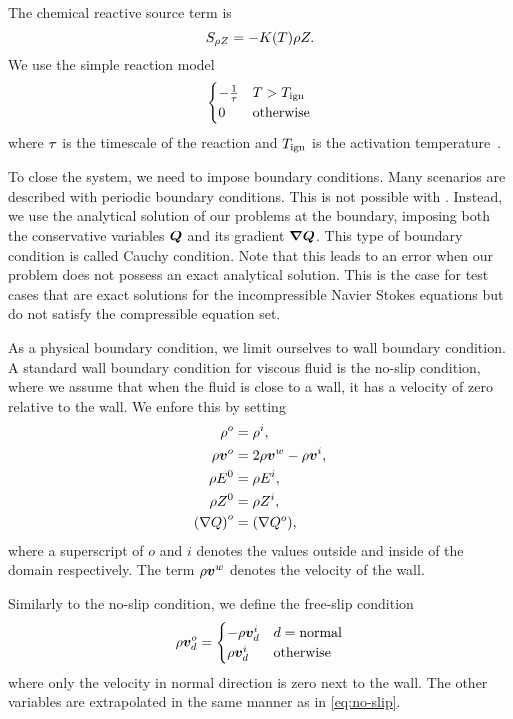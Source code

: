The chemical reactive source term is
\begin{equation}\label{eq:source-reaction}
  \source[\QZ] = - K(T) \QZ.
\end{equation}
We use the simple reaction model
\begin{equation}\label{eq:reaction-model}
\begin{cases}
  - \frac{1}{\tau} & T > T_{\text{ign}}\\
  0 & \text{otherwise}
\end{cases}  
\end{equation}
where $\tau$ is the timescale of the reaction and $T_{\text{ign}}$ is the activation temperature~\cite{hidalgo2011ader,helzel2000modified}.

To close the system, we need to impose boundary conditions.
Many scenarios are described with periodic boundary conditions.
This is not possible with \exahype{}.
Instead, we use the analytical solution of our problems at the boundary, imposing both the conservative variables $\bm{Q}$ and its gradient $\gradQ$.
This type of boundary condition is called Cauchy condition.
Note that this leads to an error when our problem does not possess an exact analytical solution.
This is the case for test cases that are exact solutions for the incompressible Navier Stokes equations but do not satisfy the compressible equation set.

As a physical boundary condition, we limit ourselves to wall boundary condition.
A standard wall boundary condition for viscous fluid is the no-slip condition, where we assume that when the fluid is close to a wall, it has a velocity of zero relative to the wall.
We enfore this by setting
\begin{align}
  \label{eq:no-slip}
  \begin{split}
  \rho^o &= \rho^i, \\
  \rho \bm{v}^o &= 2 \rho \bm{v}^w - \rho \bm{v}^i, \\
  \rho E^0 &= \rho E^i,\\
  \rho Z^0 &= \rho Z^i,\\
  {(\nabla Q)}^o &= {(\nabla Q^o)},
  \end{split}
\end{align}
where a superscript of $o$ and $i$ denotes the values outside and inside of the domain respectively.
The term $\rho \bm{v}^w$ denotes the velocity of the wall.

Similarly to the no-slip condition, we define the free-slip condition
\begin{equation}
  \label{eq:free-slip}
  \rho \bm{v}^o_d = \begin{cases}
    -\rho \bm{v}^i_d & d = \text{normal} \\
    \rho \bm{v}^i_d & \text{otherwise}
    \end{cases}
\end{equation}
where only the velocity in normal direction is zero next to the wall.
The other variables are extrapolated in the same manner as in \cref{eq:no-slip}.

